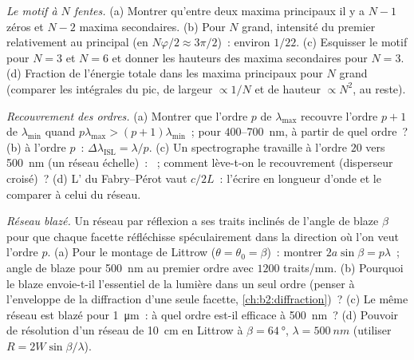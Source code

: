 \begin{exercise}[$\star\star$]\label{exo:b2:gratings:5}
\emph{Le motif à $N$ fentes.} (a) Montrer qu'entre deux maxima principaux
il y a $N - 1$ zéros et $N - 2$ maxima secondaires. (b) Pour $N$ grand,
intensité du premier  relativement au principal
(en $N\varphi/2 \approx 3\pi/2$)~: environ $1/22$. (c) Esquisser le motif pour
$N = 3$ et $N = 6$ et donner les hauteurs des maxima secondaires pour
$N = 3$. (d) Fraction de l'énergie totale dans les maxima principaux pour
$N$ grand (comparer les intégrales du pic, de largeur $\propto 1/N$ et de hauteur
$\propto N^2$, au reste).
\end{exercise}

\begin{exercise}[$\star\star$]\label{exo:b2:gratings:6}
\emph{Recouvrement des ordres.} (a) Montrer que l'ordre $p$ de $\lambda_{\max}$ recouvre
l'ordre $p + 1$ de $\lambda_{\min}$ quand $p\lambda_{\max} > (p + 1)\lambda_{\min}$~; pour $400$--\qty{700}{nm},
à partir de quel ordre~? (b)  à l'ordre $p$~: $\Delta\lambda_{\text{ISL}}
= \lambda/p$. (c) Un spectrographe travaille à l'ordre $20$ vers \qty{500}{nm} (un
réseau échelle)~: ~; comment lève-t-on le recouvrement
(disperseur croisé)~? (d) L' du Fabry--Pérot vaut $c/2L$~:
l'écrire en longueur d'onde et le comparer à celui du réseau.
\end{exercise}

\begin{exercise}[$\star\star$]\label{exo:b2:gratings:7}
\emph{Réseau blazé.} Un réseau par réflexion a ses traits inclinés de
l'angle de blaze $\beta$ pour que chaque facette réfléchisse spéculairement dans la
direction où l'on veut l'ordre $p$. (a) Pour le montage de Littrow
($\theta = \theta_0 = \beta$)~: montrer $2a\sin\beta = p\lambda$~; angle de blaze pour \qty{500}{nm}
au premier ordre avec $1200$ traits/mm. (b) Pourquoi le blaze envoie-t-il l'essentiel de la
lumière dans un seul ordre (penser à l'enveloppe de la diffraction d'une seule facette,
\cref{ch:b2:diffraction})~? (c) Le même réseau est blazé
pour \qty{1}{\micro m}~: à quel ordre est-il efficace à \qty{500}{nm}~? (d)
Pouvoir de résolution d'un réseau de \qty{10}{cm} en Littrow à $\beta = \qty{64}{\degree}$,
$\lambda = \qty{500}{nm}$ (utiliser $R = 2W\sin\beta/\lambda$).
\end{exercise}

